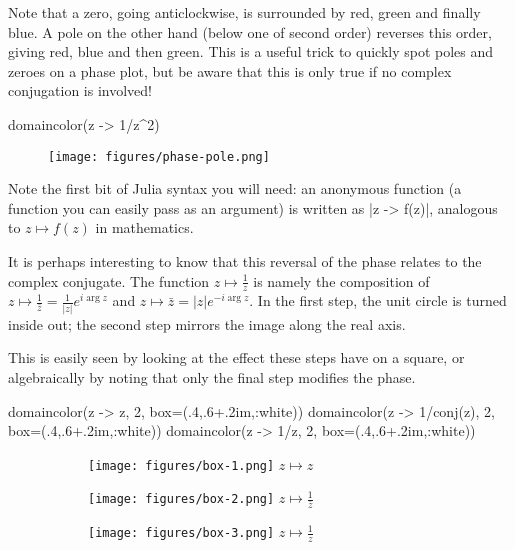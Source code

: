 \documentclass[a4paper]{article}
\begin{document}
Note that a zero, going anticlockwise, is surrounded by red, green and finally
blue. A pole on the other hand (below one of second order) reverses this order,
giving red, blue and then green. This is a useful trick to quickly spot poles
and zeroes on a phase plot, but be aware that this is only true if no complex
conjugation is involved!

\begin{juliaverbatim}
	domaincolor(z -> 1/z^2)
\end{juliaverbatim}
\begin{figure}[H]
	\centering
	\texttt{[image: figures/phase-pole.png]}
\end{figure}

Note the first bit of Julia syntax you will need: an anonymous function (a
function you can easily pass as an argument) is written as \jlv|z -> f(z)|,
analogous to $z \mapsto f(z)$ in mathematics.

It is perhaps interesting to know that this reversal of the phase relates to the
complex conjugate. The function $z \mapsto \frac{1}{z}$ is namely the
composition of $z \mapsto \frac{1}{\bar{z}} = \frac{1}{|z|} e^{i\arg z}$ and
$z \mapsto \bar{z} = |z| e^{-i\arg z}$. In the first step, the unit circle is
turned inside out; the second step mirrors the image along the real axis.

This is easily seen by looking at the effect these steps have on a square, or
algebraically by noting that only the final step modifies the phase.

\begin{juliaverbatim}
	domaincolor(z -> z, 2, box=(.4,.6+.2im,:white))
	domaincolor(z -> 1/conj(z), 2, box=(.4,.6+.2im,:white))
	domaincolor(z -> 1/z, 2, box=(.4,.6+.2im,:white))
\end{juliaverbatim}
\begin{figure}[H]
	\centering
	\begin{subfigure}{.3\textwidth}
		\centering
		\texttt{[image: figures/box-1.png]}
		$z \mapsto z$
	\end{subfigure}
	\hspace{1ex}
	\begin{subfigure}{.3\textwidth}
		\centering
		\texttt{[image: figures/box-2.png]}
		$z \mapsto \frac{1}{\bar{z}}$
	\end{subfigure}
	\hspace{1ex}
	\begin{subfigure}{.3\textwidth}
		\centering
		\texttt{[image: figures/box-3.png]}
		$z \mapsto \frac{1}{z}$
	\end{subfigure}
\end{figure}
\end{document}
